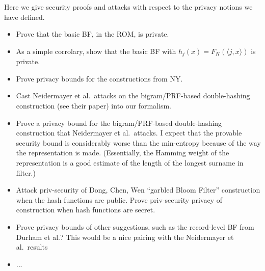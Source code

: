  Here we give security proofs and attacks with respect to the privacy notions we have defined.
\begin{itemize}
\item Prove that the basic BF, in the ROM, is private.  

\item As a simple corrolary, show that the basic BF with $h_j(x)=F_K(\langle j,x \rangle)$ is private.  

\item Prove privacy bounds for the constructions from NY. 

\item Cast Neidermayer et al.\ attacks on the bigram/PRF-based double-hashing construction (see their paper) into our formalism.  

\item Prove a privacy bound for the bigram/PRF-based double-hashing construction that Neidermayer et al.\ attacks. I expect that the provable security bound is considerably worse than the min-entropy because of the way the representation is made.  (Essentially, the Hamming weight of the representation is a good estimate of the length of the longest surname in filter.)

\item Attack priv-security of Dong, Chen, Wen ``garbled Bloom Filter'' construction when the hash functions are public.  Prove priv-security privacy of construction when hash functions are secret.  

\item Prove privacy bounds of other suggestions, such as the record-level BF from Durham et al.?  This would be a nice pairing with the Neidermayer et al.\ results

\item ...
\end{itemize}
